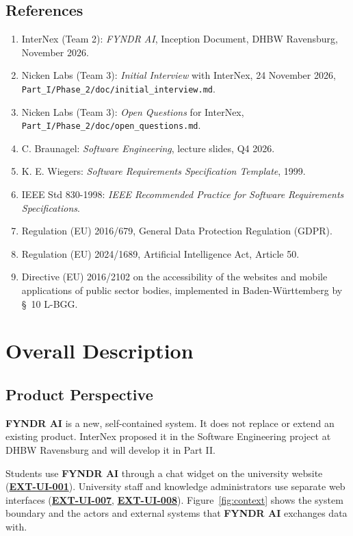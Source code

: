 \documentclass[11pt, a4paper]{article}
\newcommand{\reqref}[1]{\hyperref[req:#1]{\textbf{#1}}}
\begin{document}
\subsection{References}
\begin{enumerate}
    \item InterNex (Team 2): \textit{FYNDR AI}, Inception Document, DHBW Ravensburg, November 2026.
    \item Nicken Labs (Team 3): \textit{Initial Interview} with InterNex, 24 November 2026, \nolinkurl{Part_I/Phase_2/doc/initial_interview.md}.
    \item Nicken Labs (Team 3): \textit{Open Questions} for InterNex, \nolinkurl{Part_I/Phase_2/doc/open_questions.md}.
    \item C. Braunagel: \textit{Software Engineering}, lecture slides, Q4 2026.
    \item K. E. Wiegers: \textit{Software Requirements Specification Template}, 1999.
    \item IEEE Std 830-1998: \textit{IEEE Recommended Practice for Software Requirements Specifications}.
    \item Regulation (EU) 2016/679, General Data Protection Regulation (GDPR).
    \item Regulation (EU) 2024/1689, Artificial Intelligence Act, Article 50.
    \item Directive (EU) 2016/2102 on the accessibility of the websites and mobile applications of public sector bodies, implemented in Baden-Württemberg by \S~10 L-BGG.
\end{enumerate}

\section{Overall Description}

\subsection{Product Perspective}
\textbf{FYNDR AI} is a new, self-contained system. It does not replace or extend an existing product. InterNex proposed it in the Software Engineering project at DHBW Ravensburg and will develop it in Part II.

Students use \textbf{FYNDR AI} through a chat widget on the university website (\reqref{EXT-UI-001}). University staff and knowledge administrators use separate web interfaces (\reqref{EXT-UI-007}, \reqref{EXT-UI-008}). Figure~\ref{fig:context} shows the system boundary and the actors and external systems that \textbf{FYNDR AI} exchanges data with.
\end{document}
